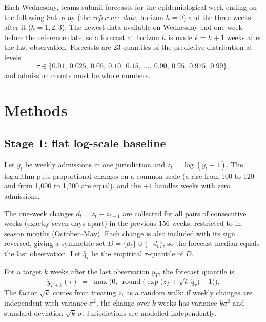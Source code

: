 \documentclass[11pt]{article}
\begin{document}
Each Wednesday, teams submit forecasts for the epidemiological week ending on the
following Saturday (the \emph{reference date}, horizon $h=0$) and the three weeks after
it ($h=1,2,3$). The newest data available on Wednesday end one week before the reference
date, so a forecast at horizon $h$ is made $k = h+1$ weeks after the last observation.
Forecasts are 23 quantiles of the predictive distribution at levels
\[
  \tau \in \{0.01,\ 0.025,\ 0.05,\ 0.10,\ 0.15,\ \ldots,\ 0.90,\ 0.95,\ 0.975,\ 0.99\},
\]
and admission counts must be whole numbers.

\section{Methods}
\label{sec:methods}

\subsection{Stage 1: flat log-scale baseline}
\label{sec:baseline}

Let $y_t$ be weekly admissions in one jurisdiction and $z_t = \log(y_t + 1)$. The
logarithm puts proportional changes on a common scale (a rise from 100 to 120 and from
1{,}000 to 1{,}200 are equal), and the $+1$ handles weeks with zero admissions.

The one-week changes $d_t = z_t - z_{t-1}$ are collected for all pairs of consecutive
weeks (exactly seven days apart) in the previous 156 weeks, restricted to in-season
months (October--May). Each change is also included with its sign reversed, giving a
symmetric set $D = \{d_t\} \cup \{-d_t\}$, so the forecast median equals the last
observation. Let $\hat q_\tau$ be the empirical $\tau$-quantile of $D$.

For a target $k$ weeks after the last observation $y_T$, the forecast quantile is
\begin{equation}
  \hat y_{T+k}(\tau) \;=\; \max\!\Big(0,\ \operatorname{round}\!\big(
      \exp\!\big(z_T + \sqrt{k}\,\hat q_\tau\big) - 1\big)\Big).
  \label{eq:baseline}
\end{equation}
The factor $\sqrt{k}$ comes from treating $z_t$ as a random walk: if weekly changes are
independent with variance $\sigma^2$, the change over $k$ weeks has variance $k\sigma^2$
and standard deviation $\sqrt{k}\,\sigma$. Jurisdictions are modelled independently.
\end{document}
